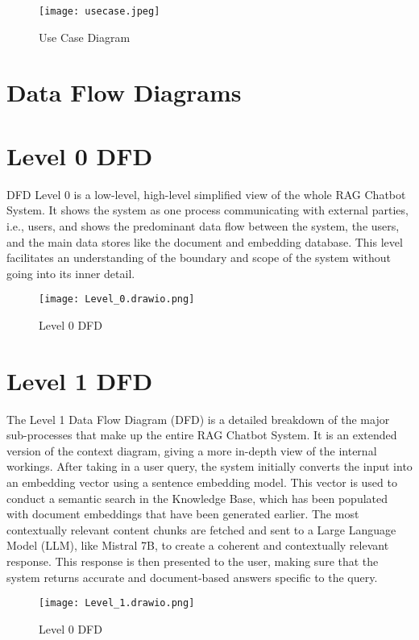 \documentclass[12pt]{report}
\begin{document}
\begin{figure}[h]
    \centering
    \texttt{[image: usecase.jpeg]}
    \caption{Use Case Diagram}
\end{figure}

\newpage
\section{Data Flow Diagrams}
\section{Level 0 DFD}
DFD Level 0 is a low-level, high-level simplified view of the whole RAG Chatbot System. It shows the system as one process communicating with external parties, i.e., users, and shows the predominant data flow between the system, the users, and the main data stores like the document and embedding database. This level facilitates an understanding of the boundary and scope of the system without going into its inner detail.

\par\vspace{1cm}
\begin{figure}[h]
    \centering
    \texttt{[image: Level\_0.drawio.png]}
    \caption{Level 0 DFD}
\end{figure}


\newpage
\section{Level 1 DFD}
The Level 1 Data Flow Diagram (DFD) is a detailed breakdown of the major sub-processes that make up the entire RAG Chatbot System. It is an extended version of the context diagram, giving a more in-depth view of the internal workings. After taking in a user query, the system initially converts the input into an embedding vector using a sentence embedding model. This vector is used to conduct a semantic search in the Knowledge Base, which has been populated with document embeddings that have been generated earlier. The most contextually relevant content chunks are fetched and sent to a Large Language Model (LLM), like Mistral 7B, to create a coherent and contextually relevant response. This response is then presented to the user, making sure that the system returns accurate and document-based answers specific to the query.
\\
\begin{figure}[h]
    \centering
    \texttt{[image: Level\_1.drawio.png]}
    \caption{Level 0 DFD}
\end{figure}
\end{document}
